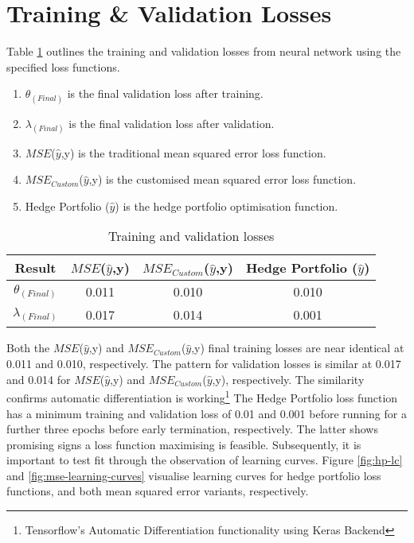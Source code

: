 \documentclass[12pt]{article}
\begin{document}
\section{Training \& Validation Losses}
Table \ref{train-val-losses} outlines the training and validation losses from neural network using the specified loss functions.
\begin{table}[H]
	\small
	\singlespacing
	\begin{enumerate}
		\item $\theta_{(Final)}$ is the final validation loss after training.
		\item $\lambda_{(Final)}$ is the final validation loss after validation.
		\item $MSE$($\hat{y}$,y) is the traditional mean squared error loss function.
		\item $MSE_{Custom}$($\hat{y}$,y) is the customised mean squared error loss function.
		\item Hedge Portfolio ($\hat{y}$) is the hedge portfolio optimisation function.
	\end{enumerate}
	\doublespacing
	\centering
	\begin{tabular}{||c||c||c||c||}
		\hline
		Result              & $MSE$($\hat{y}$,y) & $MSE_{Custom}$($\hat{y}$,y) & Hedge Portfolio ($\hat{y}$) \\ [0.5ex]
		\hline \hline
		$\theta_{(Final)}$  & 0.011              & 0.010                       & 0.010                       \\
		\hline
		$\lambda_{(Final)}$ & 0.017              & 0.014                       & 0.001                       \\
		\hline
	\end{tabular}
	\caption{Training and validation losses}
	\label{train-val-losses}
\end{table}
Both the $MSE$($\hat{y}$,y) and $MSE_{Custom}$($\hat{y}$,y) final training losses are near identical at 0.011 and 0.010, respectively.
The pattern for validation losses is similar at 0.017 and 0.014 for $MSE$($\hat{y}$,y) and $MSE_{Custom}$($\hat{y}$,y), respectively.
The similarity confirms automatic differentiation is working\footnote{Tensorflow's Automatic Differentiation functionality using Keras Backend}
The Hedge Portfolio loss function has a minimum training and validation loss of 0.01 and 0.001 before running for a further three epochs before early termination, respectively.
The latter shows promising signs a loss function maximising is feasible.
Subsequently, it is important to test fit through the observation of learning curves.
Figure \ref{fig:hp-lc} and \ref{fig:mse-learning-curves} visualise learning curves for hedge portfolio loss functions, and both mean squared error variants, respectively.
\end{document}
